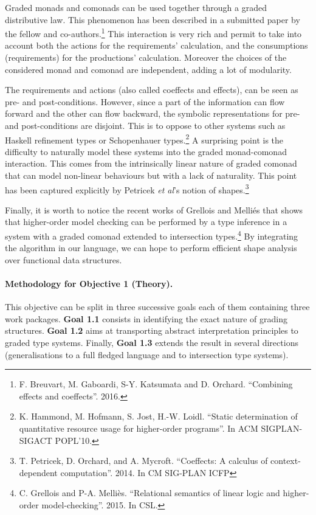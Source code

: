 \documentclass{article}[11pt]
\begin{document}
Graded monads and comonads can be used together through a graded distributive law. This phenomenon has been described in a submitted paper by the fellow and co-authors.\footnote{F. Breuvart, M. Gaboardi, S-Y. Katsumata and D. Orchard. ``Combining effects and coeffects''. 2016.} This interaction is very rich and permit to take into account both the actions for the requirements' calculation, and the consumptions (requirements) for the productions' calculation. Moreover the choices of the considered monad and comonad are independent, adding a lot of modularity.

The requirements and actions (also called coeffects and effects), can be seen as pre- and post-conditions. However, since a part of the information can flow forward and the other can flow backward, the symbolic representations for pre- and post-conditions are disjoint. This is to oppose to other systems such as Haskell refinement types or Schopenhauer types.\footnote{K. Hammond, M. Hofmann, S. Jost, H.-W. Loidl. ``Static determination of quantitative resource usage for higher-order programs''. In ACM SIGPLAN-SIGACT POPL’10.} A surprising point is the difficulty to naturally model these systems into the graded monad-comonad interaction. This comes from the intrinsically linear nature of graded comonad that can model non-linear behaviours but with a lack of naturality. This point has been captured explicitly by Petricek {\em et al}'s notion of shapes.\footnote{T. Petricek, D. Orchard, and A. Mycroft. ``Coeffects: A calculus of context-dependent computation''. 2014. In CM SIG-PLAN ICFP}

Finally, it is worth to notice the recent works of Grellois and Melli\'es that shows that higher-order model checking can be performed by a type inference in a system with a graded comonad extended to intersection types.\footnote{C. Grellois and P-A. Melli\`es. ``Relational semantics of linear logic and higher-order model-checking''. 2015. In CSL.} By integrating the algorithm in our language, we can hope to perform efficient shape analysis over functional data structures.




\paragraph{Methodology for Objective 1 (Theory).}

This objective can be split in three successive goals each of them containing three work packages. {\bf Goal 1.1} consists in identifying the exact nature of grading structures. {\bf Goal 1.2} aims at transporting abstract interpretation principles to graded type systems. Finally, {\bf Goal 1.3} extends the result in several directions (generalisations to a full fledged language and to intersection type systems).
\end{document}
